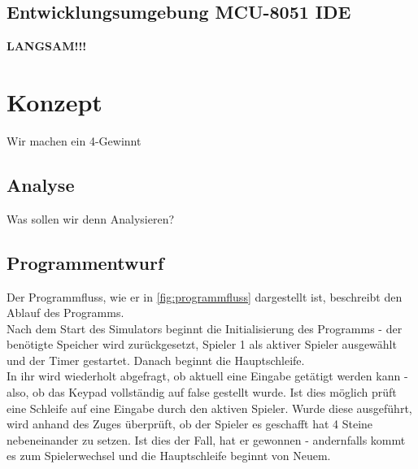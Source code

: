 \section{Entwicklungsumgebung MCU-8051 IDE}

\textbf{LANGSAM!!!}

\chapter{Konzept}

Wir machen ein 4-Gewinnt

\section{Analyse}

Was sollen wir denn Analysieren?


\section{Programmentwurf}

Der Programmfluss, wie er in \autoref{fig:programmfluss} dargestellt ist, beschreibt den Ablauf des Programms.\\
Nach dem Start des Simulators beginnt die Initialisierung des Programms - der benötigte Speicher wird zurückgesetzt, Spieler 1 als aktiver Spieler ausgewählt und der Timer gestartet. Danach beginnt die Hauptschleife.\\
In ihr wird wiederholt abgefragt, ob aktuell eine Eingabe getätigt werden kann - also, ob das Keypad vollständig auf false gestellt wurde.
Ist dies möglich prüft eine Schleife auf eine Eingabe durch den aktiven Spieler. Wurde diese ausgeführt, wird anhand des Zuges überprüft, ob der Spieler es geschafft hat 4 Steine nebeneinander zu setzen. Ist dies der Fall, hat er gewonnen - andernfalls kommt es zum Spielerwechsel und die Hauptschleife beginnt von Neuem.

